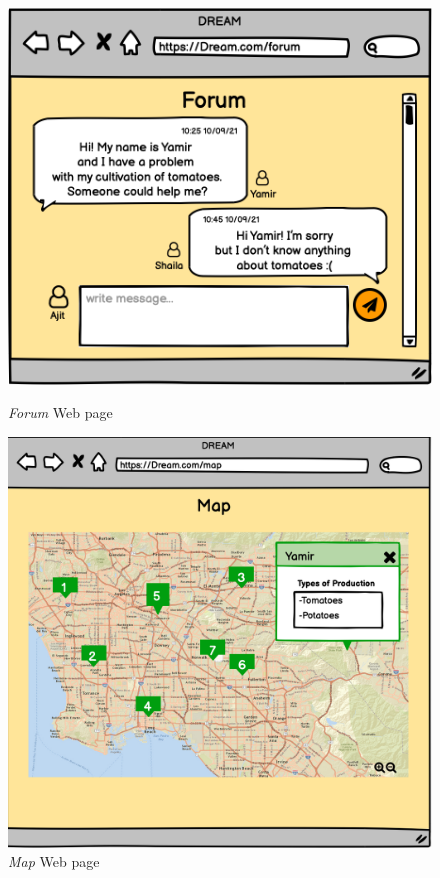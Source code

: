 \begin{figure}[H]
    \begin{minipage}{0.4\textwidth}
        \centering
        \includegraphics[width=1\textwidth]{images/mockups/Forum.png}
        \caption{\emph{Forum} Web page}
        \label{fig:forum}
    \end{minipage}\hfill
    \begin{minipage}{0.39\textwidth}
        \centering
        \includegraphics[width=1\textwidth]{images/mockups/FMap.png}
        \caption{\emph{Map} Web page}
        \label{fig:farmmap}
    \end{minipage}
\end{figure}

